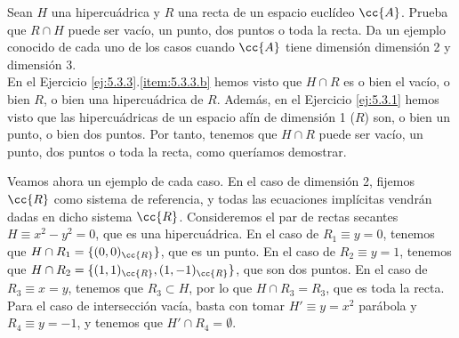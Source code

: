 \begin{ejercicio}
    Sean $H$ una hipercuádrica y $R$ una recta de un espacio euclídeo $\cc{A}$.
    Prueba que $R \cap H$ puede ser vacío, un punto, dos puntos o toda la recta.
    Da un ejemplo conocido de cada uno de los casos cuando $\cc{A}$ tiene dimensión dimensión 2 y dimensión 3.\\

    En el Ejercicio \ref{ej:5.3.3}.\ref{item:5.3.3.b} hemos visto que $H\cap R$ es o bien el vacío, o bien $R$, o bien una hipercuádrica de $R$.
    Además, en el Ejercicio \ref{ej:5.3.1} hemos visto que las hipercuádricas de un espacio afín de dimensión 1 ($R$) son, o bien un punto, o bien dos puntos.
    Por tanto, tenemos que $H\cap R$ puede ser vacío, un punto, dos puntos o toda la recta, como queríamos demostrar.

    Veamos ahora un ejemplo de cada caso. En el caso de dimensión 2, fijemos $\cc{R}$ como sistema de referencia, y todas las ecuaciones implícitas vendrán dadas en dicho sistema $\cc{R}$.
    Consideremos el par de rectas secantes $H\equiv x^2-y^2=0$, que es una hipercuádrica. En el caso de $R_1\equiv y=0$, tenemos que $H\cap R_1=\{(0,0)_{\cc{R}}\}$, que es un punto.
    En el caso de $R_2\equiv y=1$, tenemos que $H\cap R_2=\{(1,1)_{\cc{R}}, (1,-1)_{\cc{R}}\}$, que son dos puntos.
    En el caso de $R_3\equiv x=y$, tenemos que $R_3\subset H$, por lo que $H\cap R_3=R_3$, que es toda la recta. Para el caso de intersección
    vacía, basta con tomar $H'\equiv y=x^2$ parábola y $R_4\equiv y=-1$, y tenemos que $H'\cap R_4=\emptyset$. 
    \begin{figure}[H]
        \begin{subfigure}{0.45\linewidth}
\end{subfigure}
\end{figure}
\end{ejercicio}
